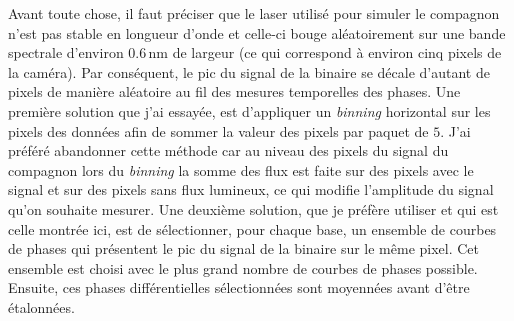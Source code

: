 Avant toute chose, il faut préciser que le laser utilisé pour simuler le compagnon n'est pas stable en longueur d'onde et celle-ci bouge aléatoirement sur une bande spectrale d'environ $0.6 \,$nm de largeur (ce qui correspond à environ cinq pixels de la caméra). Par conséquent, le pic du signal de la binaire se décale d'autant de pixels de manière aléatoire au fil des mesures temporelles des phases. Une première solution que j'ai essayée, est d'appliquer un \textit{binning} horizontal sur les pixels des données afin de sommer la valeur des pixels par paquet de $5$. J'ai préféré abandonner cette méthode car au niveau des pixels du signal du compagnon lors du \textit{binning} la somme des flux est faite sur des pixels avec le signal et sur des pixels sans flux lumineux, ce qui modifie l'amplitude du signal qu'on souhaite mesurer. Une deuxième solution, que je préfère utiliser et qui est celle montrée ici, est de sélectionner, pour chaque base, un ensemble de courbes de phases qui présentent le pic du signal de la binaire sur le même pixel. Cet ensemble est choisi avec le plus grand nombre de courbes de phases possible. Ensuite, ces phases différentielles sélectionnées sont moyennées avant d'être étalonnées.

